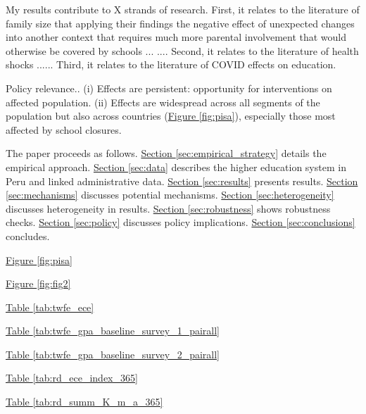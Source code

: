My results contribute to X strands of research. First, it relates to the literature of family size that applying their findings the negative effect of unexpected changes into another context that requires much more parental involvement that would otherwise be covered by schools ... \cite{black_small_2010}.... Second, it relates to the literature of health shocks ...\cite{black_sibling_2021}... Third, it relates to the literature of COVID effects on education.





Policy relevance.. (i) Effects are persistent: opportunity for interventions on affected population. (ii) Effects are widespread across all segments of the population but also across countries (\hyperref[fig:pisa]{Figure \ref{fig:pisa}}), especially those most affected by school closures.



The paper proceeds as follows. \hyperref[sec:empirical_strategy]{Section \ref{sec:empirical_strategy}} details the empirical approach. \hyperref[sec:data]{Section \ref{sec:data}}  describes the higher education system in Peru and linked administrative data. \hyperref[sec:results]{Section \ref{sec:results}} presents results. \hyperref[sec:mechanisms]{Section \ref{sec:mechanisms}} discusses potential mechanisms. \hyperref[sec:heterogeneity]{Section \ref{sec:heterogeneity}} discusses heterogeneity in results. \hyperref[sec:robustness]{Section \ref{sec:robustness}} shows robustness checks. \hyperref[sec:policy]{Section \ref{sec:policy}} discusses policy implications. \hyperref[sec:conclusions]{Section \ref{sec:conclusions}} concludes.

\hyperref[fig:pisa]{Figure \ref{fig:pisa}}

\hyperref[fig:fig2]{Figure \ref{fig:fig2}}


\hyperref[tab:twfe_ece]{Table \ref{tab:twfe_ece}}

\hyperref[tab:twfe_gpa_baseline_survey_1_pairall]{Table \ref{tab:twfe_gpa_baseline_survey_1_pairall}}

\hyperref[tab:twfe_gpa_baseline_survey_2_pairall]{Table \ref{tab:twfe_gpa_baseline_survey_2_pairall}}

\hyperref[tab:rd_ece_index_365]{Table \ref{tab:rd_ece_index_365}}

\hyperref[tab:rd_summ_K_m_a_365]{Table \ref{tab:rd_summ_K_m_a_365}}


